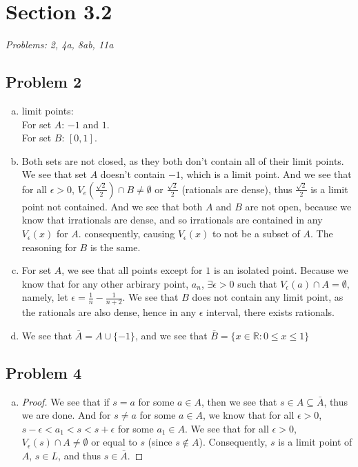 \documentclass[12pt]{article}
\begin{document}
\vspace*{1cm}


\section*{Section 3.2}
\textit{Problems: 2, 4a, 8ab, 11a}
\subsection*{Problem 2}
\begin{enumerate}[a).]
    \item {
        limit points: \\
        For set $A$: $-1$ and $1$. \\
        For set $B$: $[0,1]$. 
    }
    \item {
        Both sets are not closed, as they both don't contain all of their limit points. 
        We see that set $A$ doesn't contain $-1$, which is a limit point. 
        And we see that for all $\epsilon > 0$, $V_e(\frac{\sqrt{2}}{2}) \cap B \ne \emptyset$ or $\frac{\sqrt{2}}{2}$ (rationals are dense), thus $\frac{\sqrt{2}}{2}$ is a limit point not contained. 
        And we see that both $A$ and $B$ are not open, because we know that irrationals are dense, and so irrationals are contained in any $V_{\epsilon}(x)$ for $A$. 
        consequently, causing $V_{\epsilon} (x)$ to not be a subset of $A$. 
        The reasoning for $B$ is the same.
    }
    \item {
        For set $A$, we see that all points except for $1$ is an isolated point.
        Because we know that for any other arbirary point, $a_n$, $\exists \epsilon > 0$ such that $V_{\epsilon}(a) \cap A = \emptyset$, namely, let $\epsilon = \frac{1}{n} - \frac{1}{n + 2}$.
        We see that $B$ does not contain any limit point, as the rationals are also dense, hence in any $\epsilon$ interval, there exists rationals. 

    }
    \item {
        We see that $\bar{A} = A \cup \{-1\}$, and we see that $\bar{B} = \{x \in \mathbb{R} : 0 \le x \le 1\}$

    }
\end{enumerate}



\subsection*{Problem 4}
\begin{enumerate}[a).]
    \item {
        \begin{proof}
            We see that if $s = a$ for some $a \in A$, then we see that $s \in A \subseteq \bar{A}$, thus we are done.
            And for $s \ne a$ for some $a \in A$, we know that for all $\epsilon > 0$, $s - \epsilon < a_1 < s < s + \epsilon$ for some $a_1 \in A$. 
            We see that for all $\epsilon > 0$, $V_{\epsilon}(s) \cap A \ne \emptyset$ or equal to $s$ (since $s \notin A$). 
            Consequently, $s$ is a limit point of $A$, $s \in L$, and thus $s \in \bar{A}$. 
        \end{proof}
    }
\end{enumerate}
\end{document}
